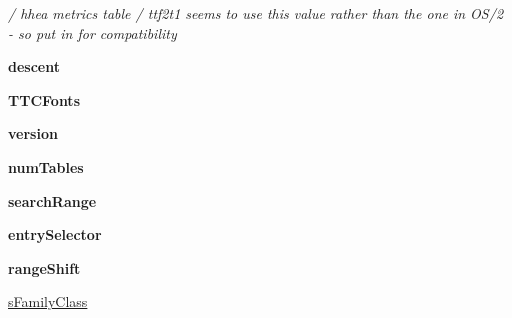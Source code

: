 \begin{DoxyCompactItemize}
\begin{DoxyCompactList}\small\item\em / hhea metrics table / ttf2t1 seems to use this value rather than the one in O\+S/2 -\/ so put in for compatibility \end{DoxyCompactList}\item 
{\bfseries descent}\hypertarget{class_libraries_1_1fpdf_1_1ttfonts_1_1_t_t_font_file_a55b7e8137a2ac697eb8c90d551203379}{}\label{class_libraries_1_1fpdf_1_1ttfonts_1_1_t_t_font_file_a55b7e8137a2ac697eb8c90d551203379}

\item 
{\bfseries T\+T\+C\+Fonts}\hypertarget{class_libraries_1_1fpdf_1_1ttfonts_1_1_t_t_font_file_af0605e0775a9db321fad9d6e10af6856}{}\label{class_libraries_1_1fpdf_1_1ttfonts_1_1_t_t_font_file_af0605e0775a9db321fad9d6e10af6856}

\item 
{\bfseries version}\hypertarget{class_libraries_1_1fpdf_1_1ttfonts_1_1_t_t_font_file_aa318edde80b87a720d66875b4825c19a}{}\label{class_libraries_1_1fpdf_1_1ttfonts_1_1_t_t_font_file_aa318edde80b87a720d66875b4825c19a}

\item 
{\bfseries num\+Tables}\hypertarget{class_libraries_1_1fpdf_1_1ttfonts_1_1_t_t_font_file_ab0216a4e3be23ba8a90630c50ecfd69f}{}\label{class_libraries_1_1fpdf_1_1ttfonts_1_1_t_t_font_file_ab0216a4e3be23ba8a90630c50ecfd69f}

\item 
{\bfseries search\+Range}\hypertarget{class_libraries_1_1fpdf_1_1ttfonts_1_1_t_t_font_file_a14a05ad6203543e7a4d924a62427d215}{}\label{class_libraries_1_1fpdf_1_1ttfonts_1_1_t_t_font_file_a14a05ad6203543e7a4d924a62427d215}

\item 
{\bfseries entry\+Selector}\hypertarget{class_libraries_1_1fpdf_1_1ttfonts_1_1_t_t_font_file_ac858e89f0e1c27770a880217d482dd91}{}\label{class_libraries_1_1fpdf_1_1ttfonts_1_1_t_t_font_file_ac858e89f0e1c27770a880217d482dd91}

\item 
{\bfseries range\+Shift}\hypertarget{class_libraries_1_1fpdf_1_1ttfonts_1_1_t_t_font_file_ae93ede88da8607459caad1ad5d132179}{}\label{class_libraries_1_1fpdf_1_1ttfonts_1_1_t_t_font_file_ae93ede88da8607459caad1ad5d132179}

\item 
\hyperlink{class_libraries_1_1fpdf_1_1ttfonts_1_1_t_t_font_file_aaaea7cfe091ba8bf1ab1bbc712ea0a79}{s\+Family\+Class}\hypertarget{class_libraries_1_1fpdf_1_1ttfonts_1_1_t_t_font_file_aaaea7cfe091ba8bf1ab1bbc712ea0a79}{}\label{class_libraries_1_1fpdf_1_1ttfonts_1_1_t_t_font_file_aaaea7cfe091ba8bf1ab1bbc712ea0a79}


\end{DoxyCompactItemize}
